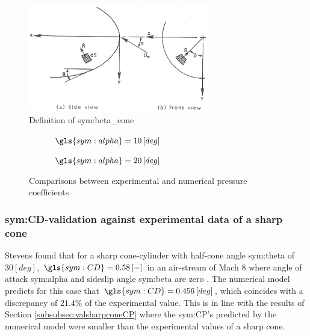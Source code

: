 \begin{figure}[ht]
	\centering
	\includegraphics[width=0.7\textwidth]{./Figure/Aerodynamics/def_beta}
	\caption[Definition of \gls{sym:beta_cone}]{Definition of \gls{sym:beta_cone} \cite{Bertin1994}}
	\label{fig:beta_cone}
\end{figure}

\begin{figure}[ht]
	\centering
	\begin{subfigure}[b]{0.49\textwidth}
		\centering
		\setlength{} 
		\setlength{}
		
		\caption{$\gls{sym:alpha}=10\left[deg\right]$}
		\label{fig:CPconealpha10}
	\end{subfigure}
		\begin{subfigure}[b]{0.49\textwidth}
			\centering
			\setlength{} 
			\setlength{}
			
		\caption{$\gls{sym:alpha}=20\left[deg\right]$}
		\label{fig:CPconealpha20}
	\end{subfigure}
	\caption{Comparisons between experimental and numerical pressure coefficients}
	\label{fig:CPcone30val}
\end{figure}

\subsubsection{\gls{sym:CD}-validation against experimental data of a sharp cone}
\label{subsubsec:valsharpconeCD}
Stevens found that for a sharp cone-cylinder with half-cone angle \gls{sym:theta} of $30\left[deg\right]$, $\gls{sym:CD}=0.58\left[-\right]$ in an air-stream of Mach $8$ where angle of attack \gls{sym:alpha} and sideslip angle \gls{sym:beta} are zero \cite{Stevens1950,AndersonJr.2007}. The numerical model predicts for this case that $\gls{sym:CD}=0.456\left[deg\right]$, which coincides with a discrepancy of $21.4\%$ of the experimental value. This is in line with the results of Section \ref{subsubsec:valsharpconeCP} where the \gls{sym:CP}'s predicted by the numerical model were smaller than the experimental values of a sharp cone.

